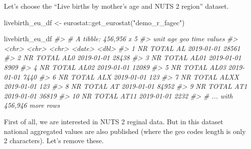 \documentclass[
]{article}
\newenvironment{Shaded}{\begin{snugshade}}{\end{snugshade}}
\newcommand{\CommentTok}[1]{\textcolor[rgb]{0.56,0.35,0.01}{\textit{#1}}}
\newcommand{\FunctionTok}[1]{\textcolor[rgb]{0.00,0.00,0.00}{#1}}
\newcommand{\NormalTok}[1]{#1}
\newcommand{\OtherTok}[1]{\textcolor[rgb]{0.56,0.35,0.01}{#1}}
\newcommand{\SpecialCharTok}[1]{\textcolor[rgb]{0.00,0.00,0.00}{#1}}
\newcommand{\StringTok}[1]{\textcolor[rgb]{0.31,0.60,0.02}{#1}}
\begin{document}
Let's choose the ``Live births by mother's age and NUTS 2 region'' dataset.

\begin{Shaded}
\begin{Highlighting}[]
\NormalTok{livebirth\_eu\_df }\OtherTok{\textless{}{-}}\NormalTok{ eurostat}\SpecialCharTok{::}\FunctionTok{get\_eurostat}\NormalTok{(}\StringTok{"demo\_r\_fagec"}\NormalTok{)}

\NormalTok{livebirth\_eu\_df}
\CommentTok{\#\textgreater{} \# A tibble: 456,956 x 5}
\CommentTok{\#\textgreater{}    unit  age   geo   time       values}
\CommentTok{\#\textgreater{}    \textless{}chr\textgreater{} \textless{}chr\textgreater{} \textless{}chr\textgreater{} \textless{}date\textgreater{}      \textless{}dbl\textgreater{}}
\CommentTok{\#\textgreater{}  1 NR    TOTAL AL    2019{-}01{-}01  28561}
\CommentTok{\#\textgreater{}  2 NR    TOTAL AL0   2019{-}01{-}01  28438}
\CommentTok{\#\textgreater{}  3 NR    TOTAL AL01  2019{-}01{-}01   8909}
\CommentTok{\#\textgreater{}  4 NR    TOTAL AL02  2019{-}01{-}01  12089}
\CommentTok{\#\textgreater{}  5 NR    TOTAL AL03  2019{-}01{-}01   7440}
\CommentTok{\#\textgreater{}  6 NR    TOTAL ALX   2019{-}01{-}01    123}
\CommentTok{\#\textgreater{}  7 NR    TOTAL ALXX  2019{-}01{-}01    123}
\CommentTok{\#\textgreater{}  8 NR    TOTAL AT    2019{-}01{-}01  84952}
\CommentTok{\#\textgreater{}  9 NR    TOTAL AT1   2019{-}01{-}01  36819}
\CommentTok{\#\textgreater{} 10 NR    TOTAL AT11  2019{-}01{-}01   2232}
\CommentTok{\#\textgreater{} \# ... with 456,946 more rows}
\end{Highlighting}
\end{Shaded}

First of all, we are interested in NUTS 2 reginal data. But in this dataset national aggregated values are also published (where the geo codes length is only 2 characters). Let's remove these.
\end{document}

